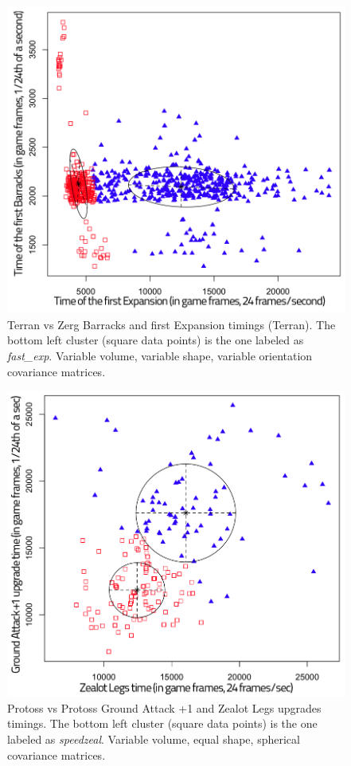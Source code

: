\begin{figure}[h]
\centerline{\includegraphics[width=0.72\columnwidth]{images/TvZraxFE.png}}
\caption{Terran vs Zerg Barracks and first Expansion timings (Terran). The bottom left cluster (square data points) is the one labeled as \textit{fast\_exp}. Variable volume, variable shape, variable orientation covariance matrices.}
\label{TvZraxFE}
\end{figure}

\begin{figure}[h]
\centerline{\includegraphics[width=0.66\columnwidth]{images/PvPspeedzeal.png}}
\caption{Protoss vs Protoss Ground Attack +1 and Zealot Legs upgrades timings. The bottom left cluster (square data points) is the one labeled as \textit{speedzeal}. Variable volume, equal shape, spherical covariance matrices.}
\label{PvPspeedzeal}
\end{figure}


